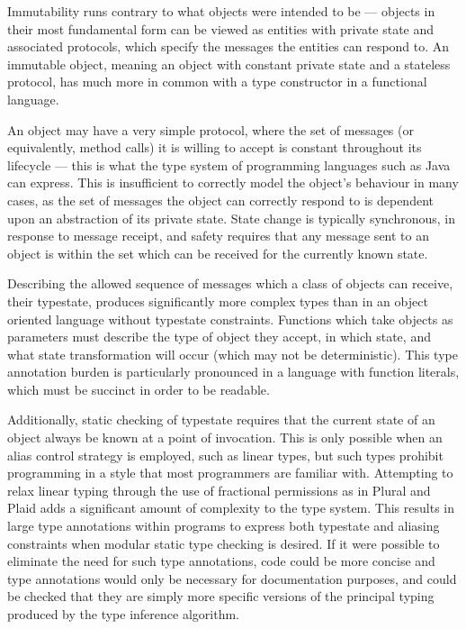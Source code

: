 \documentclass[preprint]{sigplanconf}
\begin{document}
Immutability runs contrary to what objects were intended to be --- objects in
their most fundamental form can be viewed as entities with private state and 
associated protocols, which specify the messages the entities can respond to.
An immutable object, meaning an object with constant private state and
a stateless protocol, has much more in common with a type constructor in 
a functional language.

An object may have a very simple 
protocol, where the set of messages (or equivalently, method calls) it is 
willing to accept is constant throughout its lifecycle --- this is what the 
type system of programming languages such as Java can express. This is
insufficient to correctly model the object's behaviour in many cases, as
the set of messages the object can correctly respond to is dependent upon an
abstraction of its private state. State change is typically synchronous, in 
response to message receipt, and safety requires that 
any message sent to an object is within the set which can be received for
the currently known state. 

Describing the allowed sequence of messages which a class of objects can
receive, their typestate, produces significantly more complex types than
in an object oriented language without typestate constraints. Functions which
take objects as parameters must describe the type of object they accept,
in which state, and what state transformation will occur (which may not
be deterministic). This type annotation burden is particularly pronounced
in a language with function literals, which must be succinct
in order to be readable.

Additionally, static checking of typestate requires
that the current state of an object always be known at a point of invocation.
This is only possible when an alias control strategy is employed, such as linear types, 
but such types prohibit programming in a style that most programmers are 
familiar with. Attempting to relax linear typing through the use of fractional 
permissions as in Plural and Plaid \cite{Aldrich2009,Bierhoff2009}
adds a significant amount of complexity to the type system. This results in 
large type annotations within programs to express both typestate and aliasing 
constraints when modular static type checking is desired.
If it were possible to eliminate the need for such type annotations, code
could be more concise and type annotations would only be necessary for
documentation purposes, and could be checked that they are simply more specific
versions of the principal typing produced by the type inference algorithm.
\end{document}
